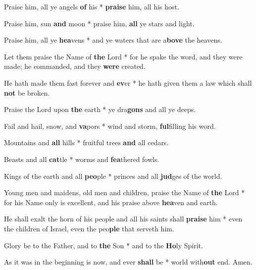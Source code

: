 \begin{multicols}{2}
	Praise him, all ye angels \textbf{of} his * \textbf{praise} him, all his host.
	
	Praise him, sun \textbf{and} moon * praise him, \textbf{all} ye stars and light.
	
	Praise him, all ye \textbf{hea}vens * and ye waters that are a\textbf{bove} the heavens.
	
	Let them praise the Name of \textbf{the} Lord * for he spake the word, and they were made; he commanded, and they \textbf{were} created.
	
	He hath made them fast forever and \textbf{ev}er * he hath given them a law which shall \textbf{not} be broken.
	
	Praise the Lord upon \textbf{the} earth * ye dra\textbf{gons} and all ye deeps.
	
	Fail and hail, snow, and \textbf{va}pors * wind and storm, \textbf{ful}filling his word.
	
	Mountains and \textbf{all} hills * fruitful trees \textbf{and} all cedars.
	
	Beasts and all \textbf{cat}tle * worms and \textbf{fea}thered fowls.
	
	Kings of the earth and all \textbf{peo}ple * princes and all \textbf{jud}ges of the world.
	
	Young men and maidens, old men and children, praise the Name of \textbf{the} Lord * for his Name only is excellent, and his praise above \textbf{hea}ven and earth.
	
	He shall exalt the horn of his people and all his saints shall \textbf{praise} him * even the children of Israel, even the peo\textbf{ple} that serveth him.
	
	Glory be to the Father, and to \textbf{the} Son * and to the \textbf{Ho}ly Spirit.
	
	As it was in the beginning is now, and ever \textbf{shall} be * world with\textbf{out} end. Amen.
\end{multicols}